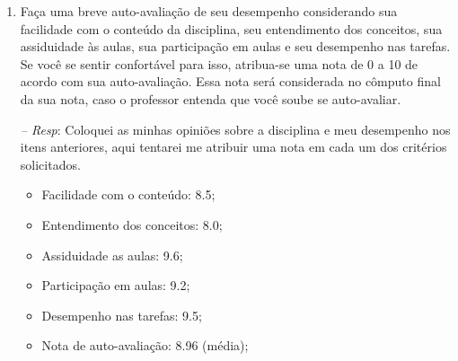\documentclass[12pt]{article}
\begin{document}
\begin{enumerate}
\begin{enumerate}
\pagebreak		
			
		\item Faça uma breve auto-avaliação de seu desempenho considerando sua 
		         facilidade com o conteúdo da disciplina, seu entendimento dos 
		         conceitos, sua assiduidade às aulas, sua
		         participação em aulas e seu desempenho nas tarefas. Se você se
		         sentir confortável para isso, atribua-se uma nota de 0 a 10
		         de acordo com sua auto-avaliação. Essa nota será considerada
		         no cômputo final da sua nota, caso o professor entenda que
		         você soube se auto-avaliar.
		\item[\textit{-- Resp}:] Coloquei as minhas opiniões sobre a disciplina e meu desempenho nos itens anteriores, aqui tentarei me atribuir uma nota em cada um dos critérios solicitados.
		\begin{itemize}
			\item Facilidade com o conteúdo: 8.5;	
			\item Entendimento dos conceitos: 8.0;
			\item Assiduidade as aulas: 9.6;
			\item Participação em aulas: 9.2;
			\item Desempenho nas tarefas: 9.5;
			\item Nota de auto-avaliação: 8.96 (média);
		\end{itemize}
	\end{enumerate}

\end{enumerate}
\end{document}
